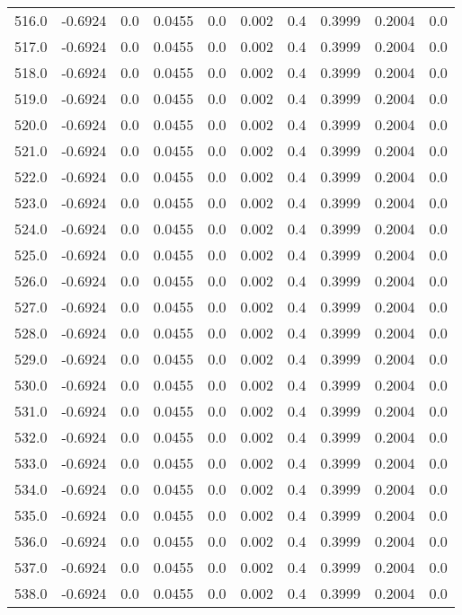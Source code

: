 \begin{longtable}{lrrrrrrrrr}
516.0 & -0.6924 & 0.0 & 0.0455 & 0.0 & 0.002 & 0.4 & 0.3999 & 0.2004 & 0.0 \\
517.0 & -0.6924 & 0.0 & 0.0455 & 0.0 & 0.002 & 0.4 & 0.3999 & 0.2004 & 0.0 \\
518.0 & -0.6924 & 0.0 & 0.0455 & 0.0 & 0.002 & 0.4 & 0.3999 & 0.2004 & 0.0 \\
519.0 & -0.6924 & 0.0 & 0.0455 & 0.0 & 0.002 & 0.4 & 0.3999 & 0.2004 & 0.0 \\
520.0 & -0.6924 & 0.0 & 0.0455 & 0.0 & 0.002 & 0.4 & 0.3999 & 0.2004 & 0.0 \\
521.0 & -0.6924 & 0.0 & 0.0455 & 0.0 & 0.002 & 0.4 & 0.3999 & 0.2004 & 0.0 \\
522.0 & -0.6924 & 0.0 & 0.0455 & 0.0 & 0.002 & 0.4 & 0.3999 & 0.2004 & 0.0 \\
523.0 & -0.6924 & 0.0 & 0.0455 & 0.0 & 0.002 & 0.4 & 0.3999 & 0.2004 & 0.0 \\
524.0 & -0.6924 & 0.0 & 0.0455 & 0.0 & 0.002 & 0.4 & 0.3999 & 0.2004 & 0.0 \\
525.0 & -0.6924 & 0.0 & 0.0455 & 0.0 & 0.002 & 0.4 & 0.3999 & 0.2004 & 0.0 \\
526.0 & -0.6924 & 0.0 & 0.0455 & 0.0 & 0.002 & 0.4 & 0.3999 & 0.2004 & 0.0 \\
527.0 & -0.6924 & 0.0 & 0.0455 & 0.0 & 0.002 & 0.4 & 0.3999 & 0.2004 & 0.0 \\
528.0 & -0.6924 & 0.0 & 0.0455 & 0.0 & 0.002 & 0.4 & 0.3999 & 0.2004 & 0.0 \\
529.0 & -0.6924 & 0.0 & 0.0455 & 0.0 & 0.002 & 0.4 & 0.3999 & 0.2004 & 0.0 \\
530.0 & -0.6924 & 0.0 & 0.0455 & 0.0 & 0.002 & 0.4 & 0.3999 & 0.2004 & 0.0 \\
531.0 & -0.6924 & 0.0 & 0.0455 & 0.0 & 0.002 & 0.4 & 0.3999 & 0.2004 & 0.0 \\
532.0 & -0.6924 & 0.0 & 0.0455 & 0.0 & 0.002 & 0.4 & 0.3999 & 0.2004 & 0.0 \\
533.0 & -0.6924 & 0.0 & 0.0455 & 0.0 & 0.002 & 0.4 & 0.3999 & 0.2004 & 0.0 \\
534.0 & -0.6924 & 0.0 & 0.0455 & 0.0 & 0.002 & 0.4 & 0.3999 & 0.2004 & 0.0 \\
535.0 & -0.6924 & 0.0 & 0.0455 & 0.0 & 0.002 & 0.4 & 0.3999 & 0.2004 & 0.0 \\
536.0 & -0.6924 & 0.0 & 0.0455 & 0.0 & 0.002 & 0.4 & 0.3999 & 0.2004 & 0.0 \\
537.0 & -0.6924 & 0.0 & 0.0455 & 0.0 & 0.002 & 0.4 & 0.3999 & 0.2004 & 0.0 \\
538.0 & -0.6924 & 0.0 & 0.0455 & 0.0 & 0.002 & 0.4 & 0.3999 & 0.2004 & 0.0 \\

\end{longtable}
